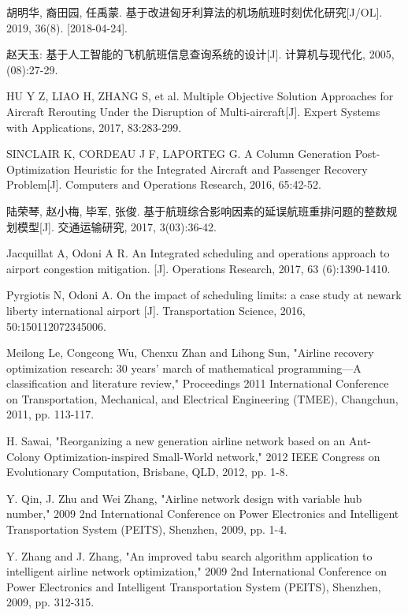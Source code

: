 \documentclass[runningheads]{llncs}
\begin{document}
\begin{thebibliography}{8}

胡明华, 裔田园, 任禹蒙. 基于改进匈牙利算法的机场航班时刻优化研究[J/OL]. 2019, 36(8). [2018-04-24]. 

赵天玉: 基于人工智能的飞机航班信息查询系统的设计[J]. 计算机与现代化, 2005, (08):27-29.

HU Y Z, LIAO H, ZHANG S, et al. Multiple Objective Solution Approaches for Aircraft Rerouting Under the Disruption of Multi-aircraft[J]. Expert Systems with Applications, 2017, 83:283-299.

SINCLAIR K, CORDEAU J F, LAPORTEG G. A Column Generation Post- Optimization Heuristic for the Integrated Aircraft and Passenger Recovery Problem[J]. Computers and Operations Research, 2016, 65:42-52.

陆荣琴, 赵小梅, 毕军, 张俊. 基于航班综合影响因素的延误航班重排问题的整数规划模型[J]. 交通运输研究, 2017, 3(03):36-42.

Jacquillat A, Odoni A R. An Integrated scheduling and operations approach to airport congestion mitigation. [J]. Operations Research, 2017, 63 (6):1390-1410. 

Pyrgiotis N, Odoni A. On the impact of scheduling limits: a case study at newark liberty international airport [J]. Transportation Science, 2016, 50:150112072345006. 

Meilong Le, Congcong Wu, Chenxu Zhan and Lihong Sun, "Airline recovery optimization research: 30 years' march of mathematical programming—A classification and literature review," Proceedings 2011 International Conference on Transportation, Mechanical, and Electrical Engineering (TMEE), Changchun, 2011, pp. 113-117.

H. Sawai, "Reorganizing a new generation airline network based on an Ant-Colony Optimization-inspired Small-World network," 2012 IEEE Congress on Evolutionary Computation, Brisbane, QLD, 2012, pp. 1-8.

Y. Qin, J. Zhu and Wei Zhang, "Airline network design with variable hub number," 2009 2nd International Conference on Power Electronics and Intelligent Transportation System (PEITS), Shenzhen, 2009, pp. 1-4.

Y. Zhang and J. Zhang, "An improved tabu search algorithm application to intelligent airline network optimization," 2009 2nd International Conference on Power Electronics and Intelligent Transportation System (PEITS), Shenzhen, 2009, pp. 312-315.


\end{thebibliography}
\end{document}
